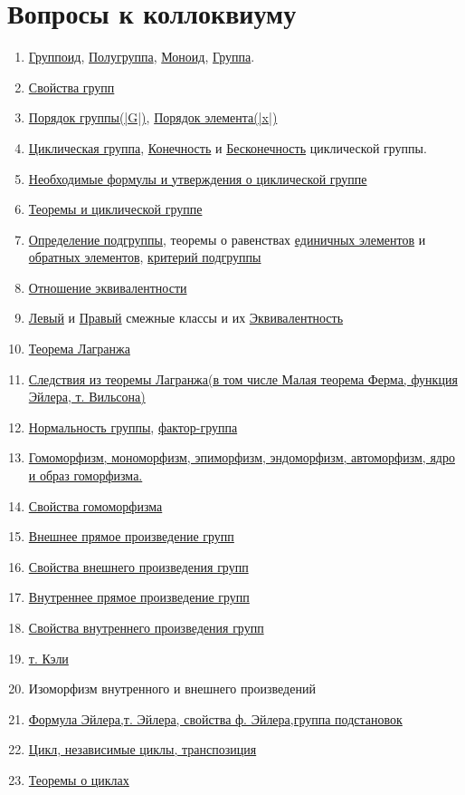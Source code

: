 \documentclass[12pt]{article}
\begin{document}
		\section{Вопросы к коллоквиуму}
		\begin{enumerate}
			\item \hyperlink{indef:gruppoid}{Группоид}, \hyperlink{indef:halfgroup}{Полугруппа}, \hyperlink{indef:monoid}{Моноид}, \hyperlink{indef:group}{Группа}.
			\item \hyperlink{inpro:group}{Свойства групп}
			\item \hyperlink{indef:por_group}{Порядок группы(|G|)}, \hyperlink{indef:kpor_el}{Порядок элемента(|x|)}
			\item \hyperlink{indef:circle_group}{Циклическая группа}, \hyperlink{indef:inf_circle_group}{Конечность} и \hyperlink{indef:noninf_circle_gtoup}{Бесконечность} циклической группы.
			\item \hyperlink{f:circle}{Необходимые формулы и утверждения о циклической группе}
			\item \hyperlink{th:circle}{Теоремы и циклической группе}
			\item \hyperlink{indef_subgroup}{Определение подгруппы}, теоремы о равенствах \hyperlink{th:subgrop_e}{единичных элементов} и \hyperlink{th:subgroup_-1}{обратных элементов}, \hyperlink{th_subgroup_cri}{критерий подгруппы}
			\item \hyperlink{indef:equiv}{Отношение эквивалентности}
			\item \hyperlink{indef:left_class}{Левый} и \hyperlink{indef:right_class}{Правый} смежные классы и их \hyperlink{th:class-equiv}{Эквивалентность}
			\item \hyperlink{t_lang}{Теорема Лагранжа}
			\item \hyperlink{sl:t_lang}{Следствия из теоремы Лагранжа(в том числе Малая теорема Ферма, функция Эйлера, т. Вильсона)}
			\item \hyperlink{indef:norm_gr}{Нормальность группы}, \hyperlink{indef:fact_gr}{фактор-группа}
			\item \hyperlink{indef:morfizm}{Гомоморфизм, мономорфизм, эпиморфизм, эндоморфизм, автоморфизм, ядро и образ гоморфизма.}
			\item \hyperlink{inpro:gom}{Свойства гомоморфизма}
			\item \hyperlink{def:comp}{Внешнее прямое произведение групп}
			\item \hyperlink{inpro:out_comp}{Свойства внешнего произведения групп}
			\item \hyperlink{def:in_comp}{Внутреннее прямое произведение групп} 
			\item \hyperlink{inpro:in_comp}{Свойства внутреннего произведения групп}
			\item \hyperlink{th:keli}{т. Кэли}
			\item Изоморфизм внутренного и внешнего произведений
			\item \hyperlink{el}{Формула Эйлера,т. Эйлера, свойства ф. Эйлера,группа подстановок}
			\item \hyperlink{def:while}{Цикл, независимые циклы, транспозиция}
			\item \hyperlink{th:while}{Теоремы о циклах}
		\end{enumerate}
\end{document}
